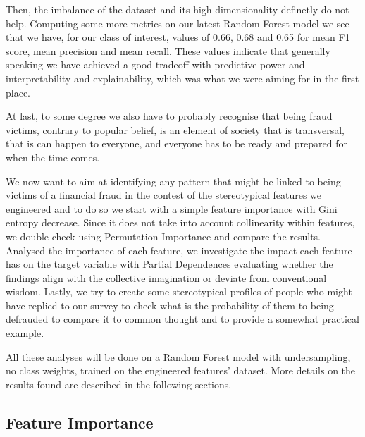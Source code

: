 \documentclass[a4paper,11pt]{article}
\begin{document}
Then, the imbalance of the dataset and its high dimensionality definetly do not help. Computing some more metrics on our latest Random Forest model we see that we have, for our class of interest, values of 0.66, 0.68 and 0.65 for mean F1 score, mean precision and mean recall. These values indicate that generally speaking we have achieved a good tradeoff with predictive power and interpretability and explainability, which was what we were aiming for in the first place. 

At last, to some degree we also have to probably recognise that being fraud victims, contrary to popular belief, is an element of society that is transversal, that is can happen to everyone, and everyone has to be ready and prepared for when the time comes. 


We now want to aim at identifying any pattern that might be linked to being victims of a financial fraud in the contest of the stereotypical features we engineered and to do so we start with a simple feature importance with Gini entropy decrease. Since it does not take into account collinearity within features, we double check using Permutation Importance and compare the results. Analysed the importance of each feature, we investigate the impact each feature has on the target variable with Partial Dependences evaluating whether the findings align with the collective imagination or deviate from conventional wisdom. Lastly, we try to create some stereotypical profiles of people who might have replied to our survey to check what is the probability of them to being defrauded to compare it to common thought and to provide a somewhat practical example.

All these analyses will be done on a Random Forest model with undersampling, no class weights, trained on the engineered features' dataset.
More details on the results found are described in the following sections.


\subsection{Feature Importance}
\end{document}

